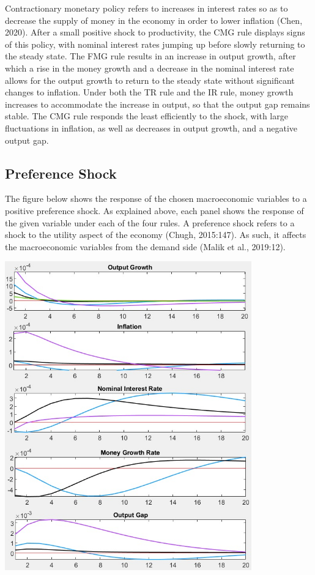 \documentclass[11pt,preprint, authoryear]{elsarticle}
\let\origfigure\figure
\let\endorigfigure\endfigure
\renewenvironment{figure}[1][2] {
    \expandafter\origfigure\expandafter[H]
} {
    \endorigfigure
}
\numberwithin{equation}{section}
\numberwithin{figure}{section}
\numberwithin{table}{section}
\begin{document}
Contractionary monetary policy refers to increases in interest rates so
as to decrease the supply of money in the economy in order to lower
inflation (Chen, 2020). After a small positive shock to productivity,
the CMG rule displays signs of this policy, with nominal interest rates
jumping up before slowly returning to the steady state. The FMG rule
results in an increase in output growth, after which a rise in the money
growth and a decrease in the nominal interest rate allows for the output
growth to return to the steady state without significant changes to
inflation. Under both the TR rule and the IR rule, money growth
increases to accommodate the increase in output, so that the output gap
remains stable. The CMG rule responds the least efficiently to the
shock, with large fluctuations in inflation, as well as decreases in
output growth, and a negative output gap.

\hypertarget{preference-shock}{%
\subsection{Preference Shock}\label{preference-shock}}

The figure below shows the response of the chosen macroeconomic
variables to a positive preference shock. As explained above, each panel
shows the response of the given variable under each of the four rules. A
preference shock refers to a shock to the utility aspect of the economy
(Chugh, 2015:147). As such, it affects the macroeconomic variables from
the demand side (Malik et al., 2019:12).

\begin{figure}
\centering
\includegraphics[width=0.8\textwidth,height=0.6\textheight]{./figures/preference-shock.jpeg}
\caption{Plots of Impulse Response Functions for a Preference Shock}
\end{figure}
\end{document}
